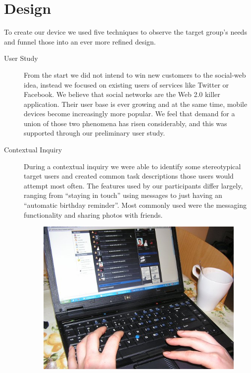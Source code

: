 %
%
%
\section{Design}
%
To create our device we used five techniques 
to observe the target group's needs and funnel those 
into an ever more refined design. 
\begin{description}
  \item[User Study] From the start we did not intend to win new customers to 
    the social-web idea, instead we focused on existing users
    of services like Twitter or Facebook\registered. 
    We believe that social networks are the Web 2.0 killer application. 
    Their user base is ever growing and at the same time, mobile devices
    become increasingly more popular. We feel that demand for a union of 
    those two phenomena has risen considerably, and this was supported through our preliminary 
    user study.
  \item[Contextual Inquiry]
    During a contextual inquiry we were able to identify some stereotypical 
    target users and created common task descriptions those users would 
    attempt most often. The features used by our participants differ largely, ranging 
    from ``staying in touch'' using messages to just having an ``automatic 
    birthday reminder''. Most commonly used were the messaging functionality and
    sharing photos with friends.
\begin{figure}[h]
 \begin{center}
   \includegraphics[width=0.8\linewidth]{imgs/context.png}

\end{center}
\end{figure}
\end{description}
